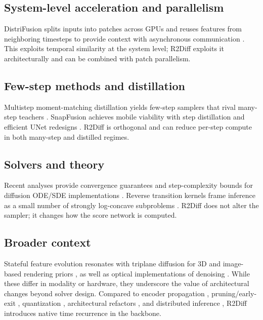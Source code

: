 \documentclass{article}
\begin{document}
\subsection{System-level acceleration and parallelism}
DistriFusion splits inputs into patches across GPUs and reuses features from neighboring timesteps to provide context with asynchronous communication \cite{li-2024-distrifusion}. This exploits temporal similarity at the system level; R2Diff exploits it architecturally and can be combined with patch parallelism.

\subsection{Few-step methods and distillation}
Multistep moment-matching distillation yields few-step samplers that rival many-step teachers \cite{salimans-2024-multistep}. SnapFusion achieves mobile viability with step distillation and efficient UNet redesigns \cite{li-2023-snapfusion}. R2Diff is orthogonal and can reduce per-step compute in both many-step and distilled regimes.

\subsection{Solvers and theory}
Recent analyses provide convergence guarantees and step-complexity bounds for diffusion ODE/SDE implementations \cite{chen-2023-the,chen-2022-sampling,cheng-2017-convergence,chen-2022-improved,benton-2023-nearlyd}. Reverse transition kernels frame inference as a small number of strongly log-concave subproblems \cite{huang-2024-reverse}. R2Diff does not alter the sampler; it changes how the score network is computed.

\subsection{Broader context}
Stateful feature evolution resonates with triplane diffusion for 3D \cite{shue-2022-neural} and image-based rendering priors \cite{anciukeviius-2024-denoising}, as well as optical implementations of denoising \cite{oguz-2024-optical}. While these differ in modality or hardware, they underscore the value of architectural changes beyond solver design. Compared to encoder propagation \cite{li-2023-faster}, pruning/early-exit \cite{zhu-2024-dip,moon-2024-simple}, quantization \cite{shang-2022-post}, architectural refactors \cite{yan-2023-diffusion,phung-2022-wavelet}, and distributed inference \cite{li-2024-distrifusion}, R2Diff introduces native time recurrence in the backbone.
\end{document}
